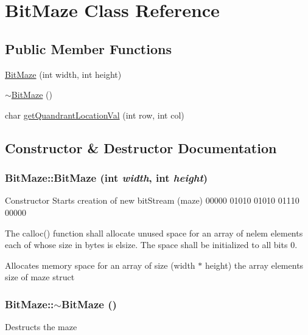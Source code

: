 \hypertarget{classBitMaze}{
\section{BitMaze Class Reference}
\label{d2/ddb/classBitMaze}
}
\subsection*{Public Member Functions}
\begin{DoxyCompactItemize}
\item 
\hyperlink{classBitMaze_a2737794f74547d90f798d9dda22baa77}{BitMaze} (int width, int height)
\item 
\hyperlink{classBitMaze_a9f64c317b829e1250e52fdb8211749b6}{$\sim$BitMaze} ()
\item 
char \hyperlink{classBitMaze_a000c5d409337b621996c5fbbfe991890}{getQuandrantLocationVal} (int row, int col)
\end{DoxyCompactItemize}


\subsection{Constructor \& Destructor Documentation}
\hypertarget{classBitMaze_a2737794f74547d90f798d9dda22baa77}{
\subsubsection[{BitMaze}]{\setlength{\rightskip}{0pt plus 5cm}BitMaze::BitMaze (int {\em width}, \/  int {\em height})}}
\label{d2/ddb/classBitMaze_a2737794f74547d90f798d9dda22baa77}
Constructor Starts creation of new bitStream (maze) 00000 01010 01010 01110 00000

The calloc() function shall allocate unused space for an array of nelem elements each of whose size in bytes is elsize. The space shall be initialized to all bits 0.

Allocates memory space for an array of size (width $\ast$ height) the array elements size of maze struct \hypertarget{classBitMaze_a9f64c317b829e1250e52fdb8211749b6}{
\subsubsection[{$\sim$BitMaze}]{\setlength{\rightskip}{0pt plus 5cm}BitMaze::$\sim$BitMaze ()}}
\label{d2/ddb/classBitMaze_a9f64c317b829e1250e52fdb8211749b6}
Destructs the maze 

